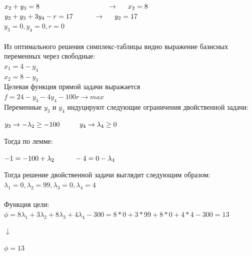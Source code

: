 \documentclass[14pt,a4paper,fleqn]{extarticle}
\begin{document}
$x_2 + y_3 = 8 \hspace*{3.4cm} \rightarrow \hspace*{0.5cm} x_2 = 8$\\
$y_2 + y_3 + 3y_4 - r = 17 \hspace*{1.05cm} \rightarrow \hspace*{0.5cm} y_2 = 17$\\
$y_3 = 0, y_4 = 0, r = 0$\\
\noindent\makebox[\linewidth]{\rule{\paperwidth}{0.4pt}}\\
Из оптимального решения симплекс-таблицы видно выражение базисных переменных через свободные:\\
$x_1 = 4 - y_4$\\
$x_2 = 8 - y_3$\\
Целевая функция прямой задачи выражается\\
$f = 24 - y_3 - 4y_4 - 100r \rightarrow max$\\
Переменные $y_3$ и $y_4$ индуцируют следующие ограничения двойственной задачи:
\begin{center}
	$y_3 \rightarrow -\lambda_2 \geq -100 \hspace*{1cm} y_4 \rightarrow \lambda_4 \geq 0$
\end{center}
Тогда по лемме:
\begin{center}
	$-1 = -100 + \lambda_2 \hspace*{1cm} -4 = 0 - \lambda_4$
\end{center}
\newpage
Тогда решение двойственной задачи выглядит следующим образом:\\
$\lambda_1 = 0, \lambda_2 = 99, \lambda_3 = 0, \lambda_4 = 4$\\\\
Функция цели:\\
$\phi = 8\lambda_1 + 3\lambda_2 + 8\lambda_3 + 4\lambda_4 - 300 = 8*0 + 3*99 + 8*0 + 4*4 - 300 = 13$
\begin{center}$\downarrow$\end{center}
$\phi = 13$\\
\end{document}
